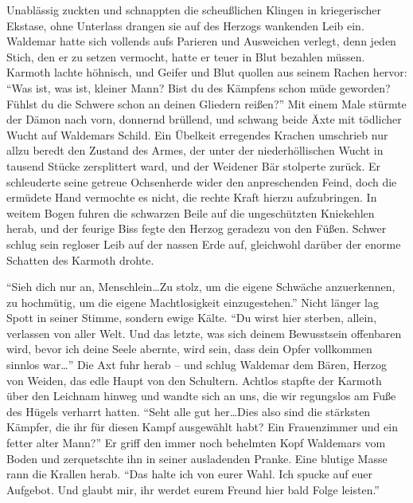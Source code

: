 Unablässig zuckten und schnappten die scheußlichen Klingen in kriegerischer Ekstase, ohne Unterlass drangen sie auf des Herzogs wankenden Leib ein. Waldemar hatte sich vollends aufs Parieren und Ausweichen verlegt, denn jeden Stich, den er zu setzen vermocht, hatte er teuer in Blut bezahlen müssen. Karmoth lachte höhnisch, und Geifer und Blut quollen aus seinem Rachen hervor: ``Was ist, was ist, kleiner Mann? Bist du des Kämpfens schon müde geworden? Fühlst du die Schwere schon an deinen Gliedern reißen?'' Mit einem Male stürmte der Dämon nach vorn, donnernd brüllend, und schwang beide Äxte mit tödlicher Wucht auf Waldemars Schild. Ein Übelkeit erregendes Krachen umschrieb nur allzu beredt den Zustand des Armes, der unter der niederhöllischen Wucht in tausend Stücke zersplittert ward, und der Weidener Bär stolperte zurück. Er schleuderte seine getreue Ochsenherde wider den anpreschenden Feind, doch die ermüdete Hand vermochte es nicht, die rechte Kraft hierzu aufzubringen. In weitem Bogen fuhren die schwarzen Beile auf die ungeschützten Kniekehlen herab, und der feurige Biss fegte den Herzog geradezu von den Füßen. Schwer schlug sein regloser Leib auf der nassen Erde auf, gleichwohl darüber der enorme Schatten des Karmoth drohte.

``Sieh dich nur an, Menschlein\dots Zu stolz, um die eigene Schwäche anzuerkennen, zu hochmütig, um die eigene Machtlosigkeit einzugestehen.'' Nicht länger lag Spott in seiner Stimme, sondern ewige Kälte. ``Du wirst hier sterben, allein, verlassen von aller Welt. Und das letzte, was sich deinem Bewusstsein offenbaren wird, bevor ich deine Seele abernte, wird sein, dass dein Opfer vollkommen sinnlos war\dots'' Die Axt fuhr herab -- und schlug Waldemar dem Bären, Herzog von Weiden, das edle Haupt von den Schultern. Achtlos stapfte der Karmoth über den Leichnam hinweg und wandte sich an uns, die wir regungslos am Fuße des Hügels verharrt hatten. ``Seht alle gut her\dots Dies also sind die stärksten Kämpfer, die ihr für diesen Kampf ausgewählt habt? Ein Frauenzimmer und ein fetter alter Mann?'' Er griff den immer noch behelmten Kopf Waldemars vom Boden und zerquetschte ihn in seiner ausladenden Pranke. Eine blutige Masse rann die Krallen herab. ``Das halte ich von eurer Wahl. Ich spucke auf euer Aufgebot. Und glaubt mir, ihr werdet eurem Freund hier bald Folge leisten.''

